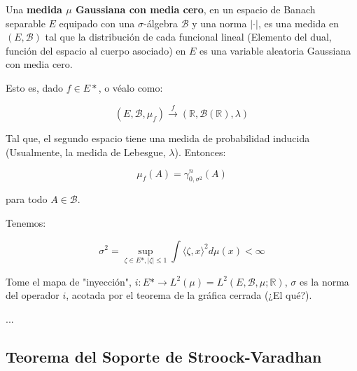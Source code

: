 \begin{boxDef}
	Una \textbf{medida $\mu$ Gaussiana con media cero}, en un espacio de Banach separable $E$ equipado con una $\sigma$-álgebra $\mathcal{B}$ y una norma $\lvert \cdot \rvert$, es una medida en $(E, \mathcal{B})$ tal que la distribución de cada funcional lineal (Elemento del dual, función del espacio al cuerpo asociado) en $E$ es una variable aleatoria Gaussiana con media cero.

	Esto es, dado $f \in E*$, o véalo como:

	\[
		(E, \mathcal{B}, \mu_f) \stackrel{f}{\rightarrow} (\mathbb{R}, \mathcal{B}(\mathbb{R}), \lambda)
	\]

	Tal que, el segundo espacio tiene una medida de probabilidad inducida (Usualmente, la medida de Lebesgue, $\lambda$). Entonces:

	\[
		\mu_f (A) = \gamma^n_{0, \sigma^2} (A)
	\]

	para todo $A \in \mathcal{B}$. 
\end{boxDef}

Tenemos:

\[
	\sigma^2 = \sup_{\zeta \in E*, \lvert \zeta \rvert \leq 1} \int \langle \zeta, x \rangle^2 d\mu(x) < \infty
\]

Tome el mapa de "inyección", $i: E* \rightarrow L^2 (\mu) = L^2 (E, \mathcal{B}, \mu; \mathbb{R})$, $\sigma$ es la norma del operador $i$, acotada por el teorema de la gráfica cerrada (¿El qué?).

...





\subsection{Teorema del Soporte de Stroock-Varadhan}




